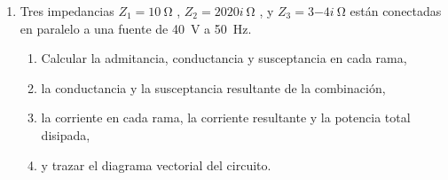 \documentclass[11pt,spanish,a4paper]{article}
\begin{document}
\begin{enumerate}


	\item Tres impedancias \(Z_1= \SI{10}{\ohm}\) , \(Z_2= \SI{20+20i}{\ohm}\) , y \(Z_3= \SI{3-4i}{\ohm} \) están conectadas en paralelo a una fuente de \SI{40}{\volt} a \SI{50}{\hertz}.
	\begin{enumerate}
		\item Calcular la admitancia, conductancia y susceptancia en cada rama,
		\item la conductancia y la susceptancia resultante de la combinación,
		\item la corriente en cada rama, la corriente resultante y la potencia total disipada,
		\item y trazar el diagrama vectorial del circuito.
	\end{enumerate}



\end{enumerate}
\end{document}
